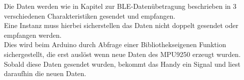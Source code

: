 Die Daten werden wie in Kapitel zur BLE-Datenübetragung beschrieben in 
3 verschiedenen Charakteristiken gesendet und empfangen. \\
Eine Instanz muss hierbei sicherstellen das Daten
nicht doppelt gesendet oder empfangen werden.\\
Dies wird beim Arduino durch Abfrage einer Bibliothekseigenen Funktion
sichergestellt, die erst auslöst wenn neue Daten des MPU9250 erzeugt wurden.\\
Sobald diese Daten gesendet wurden, bekommt das Handy ein Signal und liest
daraufhin die neuen Daten.
